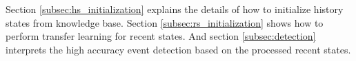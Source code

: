 \documentclass[runningheads,a4paper]{llncs}
\begin{document}
Section \ref{subsec:hs_initialization} explains the details of how to initialize history states from knowledge base.
Section \ref{subsec:rs_initialization} shows how to perform transfer learning for recent states.
And section \ref{subsec:detection} interprets the high accuracy event detection based on the processed recent states.

\end{document}
